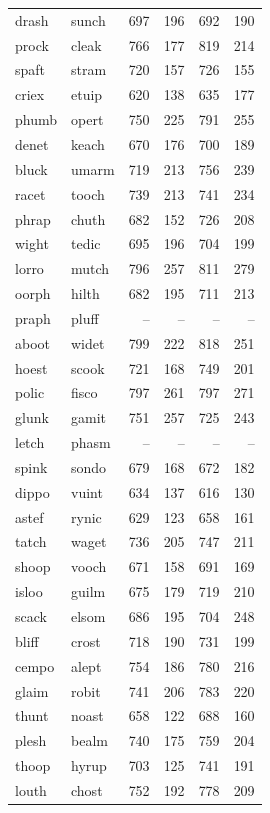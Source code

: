 \documentclass[
]{interact}
\begin{document}
\begin{longtable*}{llrrrr}
drash & sunch & 697 & 196 & 692 & 190 \\ 
prock & cleak & 766 & 177 & 819 & 214 \\ 
spaft & stram & 720 & 157 & 726 & 155 \\ 
criex & etuip & 620 & 138 & 635 & 177 \\ 
phumb & opert & 750 & 225 & 791 & 255 \\ 
denet & keach & 670 & 176 & 700 & 189 \\ 
bluck & umarm & 719 & 213 & 756 & 239 \\ 
racet & tooch & 739 & 213 & 741 & 234 \\ 
phrap & chuth & 682 & 152 & 726 & 208 \\ 
wight & tedic & 695 & 196 & 704 & 199 \\ 
lorro & mutch & 796 & 257 & 811 & 279 \\ 
oorph & hilth & 682 & 195 & 711 & 213 \\ 
praph & pluff & – & – & – & – \\ 
aboot & widet & 799 & 222 & 818 & 251 \\ 
hoest & scook & 721 & 168 & 749 & 201 \\ 
polic & fisco & 797 & 261 & 797 & 271 \\ 
glunk & gamit & 751 & 257 & 725 & 243 \\ 
letch & phasm & – & – & – & – \\ 
spink & sondo & 679 & 168 & 672 & 182 \\ 
dippo & vuint & 634 & 137 & 616 & 130 \\ 
astef & rynic & 629 & 123 & 658 & 161 \\ 
tatch & waget & 736 & 205 & 747 & 211 \\ 
shoop & vooch & 671 & 158 & 691 & 169 \\ 
isloo & guilm & 675 & 179 & 719 & 210 \\ 
scack & elsom & 686 & 195 & 704 & 248 \\ 
bliff & crost & 718 & 190 & 731 & 199 \\ 
cempo & alept & 754 & 186 & 780 & 216 \\ 
glaim & robit & 741 & 206 & 783 & 220 \\ 
thunt & noast & 658 & 122 & 688 & 160 \\ 
plesh & bealm & 740 & 175 & 759 & 204 \\ 
thoop & hyrup & 703 & 125 & 741 & 191 \\ 
louth & chost & 752 & 192 & 778 & 209 \\ 

\end{longtable*}
\end{document}
